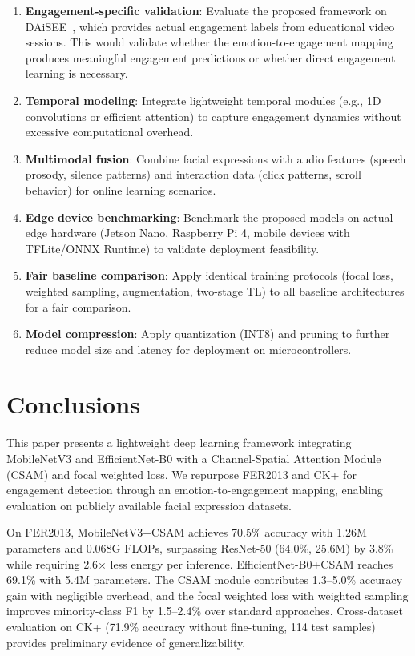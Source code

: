 \documentclass[apajournal,article,submit,pdftex,moreauthors]{Definitions/mdpi}
\begin{document}
\begin{enumerate}
\item \textbf{Engagement-specific validation}: Evaluate the proposed framework on DAiSEE~\citep{solanki2022engagement}, which provides actual engagement labels from educational video sessions. This would validate whether the emotion-to-engagement mapping produces meaningful engagement predictions or whether direct engagement learning is necessary.
\item \textbf{Temporal modeling}: Integrate lightweight temporal modules (e.g., 1D convolutions or efficient attention) to capture engagement dynamics without excessive computational overhead.
\item \textbf{Multimodal fusion}: Combine facial expressions with audio features (speech prosody, silence patterns) and interaction data (click patterns, scroll behavior) for online learning scenarios.
\item \textbf{Edge device benchmarking}: Benchmark the proposed models on actual edge hardware (Jetson Nano, Raspberry Pi 4, mobile devices with TFLite/ONNX Runtime) to validate deployment feasibility.
\item \textbf{Fair baseline comparison}: Apply identical training protocols (focal loss, weighted sampling, augmentation, two-stage TL) to all baseline architectures for a fair comparison.
\item \textbf{Model compression}: Apply quantization (INT8) and pruning to further reduce model size and latency for deployment on microcontrollers.
\end{enumerate}

\section{Conclusions}
\label{sec:conclusion}

This paper presents a lightweight deep learning framework integrating MobileNetV3 and EfficientNet-B0 with a Channel-Spatial Attention Module (CSAM) and focal weighted loss. We repurpose FER2013 and CK+ for engagement detection through an emotion-to-engagement mapping, enabling evaluation on publicly available facial expression datasets.

On FER2013, MobileNetV3+CSAM achieves 70.5\% accuracy with 1.26M parameters and 0.068G FLOPs, surpassing ResNet-50 (64.0\%, 25.6M) by 3.8\% while requiring 2.6$\times$ less energy per inference. EfficientNet-B0+CSAM reaches 69.1\% with 5.4M parameters. The CSAM module contributes 1.3--5.0\% accuracy gain with negligible overhead, and the focal weighted loss with weighted sampling improves minority-class F1 by 1.5--2.4\% over standard approaches. Cross-dataset evaluation on CK+ (71.9\% accuracy without fine-tuning, 114 test samples) provides preliminary evidence of generalizability.
\end{document}
